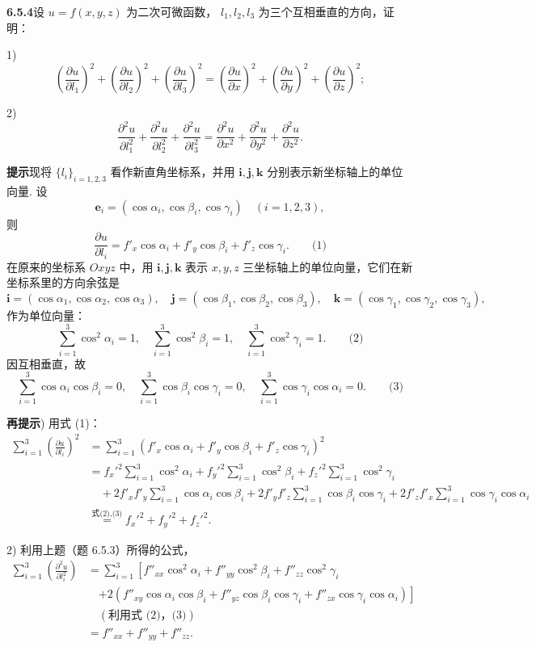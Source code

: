 \documentclass[UTF8, 12pt, fontset=fandol, oneside]{ctexart}
\begin{document}
\noindent\textbf{6.5.4}\quad 设 $u=f(x,y,z)$ 为二次可微函数，
$l_1,l_2,l_3$ 为三个互相垂直的方向，证明：

1)
\[
  \left(\frac{\partial u}{\partial l_1}\right)^2+
  \left(\frac{\partial u}{\partial l_2}\right)^2+
  \left(\frac{\partial u}{\partial l_3}\right)^2
  =
  \left(\frac{\partial u}{\partial x}\right)^2+
  \left(\frac{\partial u}{\partial y}\right)^2+
  \left(\frac{\partial u}{\partial z}\right)^2;
\]

2)
\[
  \frac{\partial^2u}{\partial l_1^2}+
  \frac{\partial^2u}{\partial l_2^2}+
  \frac{\partial^2u}{\partial l_3^2}
  =
  \frac{\partial^2u}{\partial x^2}+
  \frac{\partial^2u}{\partial y^2}+
  \frac{\partial^2u}{\partial z^2}.
\]

\noindent\textbf{提示}\quad 现将 $\{l_i\}_{i=1,2,3}$ 看作新直角坐标系，并用
$\mathbf i,\mathbf j,\mathbf k$ 分别表示新坐标轴上的单位向量. 设
\[
  \mathbf e_i=(\cos\alpha_i,\cos\beta_i,\cos\gamma_i)\quad(i=1,2,3),
\]
则
\[
  \frac{\partial u}{\partial l_i}
  =
  f'_x\cos\alpha_i+f'_y\cos\beta_i+f'_z\cos\gamma_i. \qquad\text{(1)}
\]
在原来的坐标系 $Oxyz$ 中，用 $\mathbf i,\mathbf j,\mathbf k$ 表示 $x,y,z$ 三坐标轴上的单位向量，它们在新坐标系里的方向余弦是
\[
  \mathbf i=(\cos\alpha_1,\cos\alpha_2,\cos\alpha_3),\quad
  \mathbf j=(\cos\beta_1,\cos\beta_2,\cos\beta_3),\quad
  \mathbf k=(\cos\gamma_1,\cos\gamma_2,\cos\gamma_3),
\]
作为单位向量：
\[
  \sum_{i=1}^3\cos^2\alpha_i=1,\quad
  \sum_{i=1}^3\cos^2\beta_i=1,\quad
  \sum_{i=1}^3\cos^2\gamma_i=1. \qquad\text{(2)}
\]
因互相垂直，故
\[
  \sum_{i=1}^3\cos\alpha_i\cos\beta_i=0,\quad
  \sum_{i=1}^3\cos\beta_i\cos\gamma_i=0,\quad
  \sum_{i=1}^3\cos\gamma_i\cos\alpha_i=0. \qquad\text{(3)}
\]

\noindent\textbf{再提示}) 用式 (1)：
\[
\begin{aligned}
  \sum_{i=1}^3\left(\frac{\partial u}{\partial l_i}\right)^2
  &=
  \sum_{i=1}^3(f'_x\cos\alpha_i+f'_y\cos\beta_i+f'_z\cos\gamma_i)^2\\
  &=
  f_x'^2\sum_{i=1}^3\cos^2\alpha_i+
  f_y'^2\sum_{i=1}^3\cos^2\beta_i+
  f_z'^2\sum_{i=1}^3\cos^2\gamma_i\\
  &\quad+
  2f'_xf'_y\sum_{i=1}^3\cos\alpha_i\cos\beta_i+
  2f'_yf'_z\sum_{i=1}^3\cos\beta_i\cos\gamma_i+
  2f'_zf'_x\sum_{i=1}^3\cos\gamma_i\cos\alpha_i\\
  &\overset{\text{式(2),(3)}}{=}
  f_x'^2+f_y'^2+f_z'^2.
\end{aligned}
\]

2) 利用上题（题 6.5.3）所得的公式，
\[
\begin{aligned}
  \sum_{i=1}^3\left(\frac{\partial^2u}{\partial l_i^2}\right)
  &=
  \sum_{i=1}^3
  \left[
  f''_{xx}\cos^2\alpha_i+
  f''_{yy}\cos^2\beta_i+
  f''_{zz}\cos^2\gamma_i\right.\\
  &\quad\left.
  +2\left(
  f''_{xy}\cos\alpha_i\cos\beta_i+
  f''_{yz}\cos\beta_i\cos\gamma_i+
  f''_{zx}\cos\gamma_i\cos\alpha_i
  \right)\right]\\
  &\quad(\text{利用式 (2)，(3)})\\
  &=f''_{xx}+f''_{yy}+f''_{zz}.
\end{aligned}
\]
\end{document}
